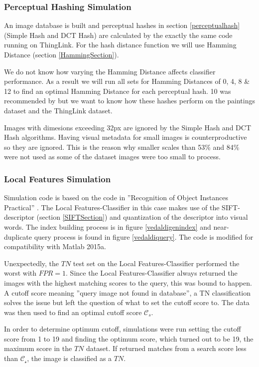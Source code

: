 \documentclass[english,12pt,a4paper,pdftex,elec,utf8, table]{aaltothesis}
\begin{document}
\subsubsection{Perceptual Hashing Simulation}
An image database is built and perceptual hashes in section \ref{perceptualhash} (Simple Hash and DCT Hash) are calculated by the exactly the same code running on ThingLink. For the hash distance function we will use Hamming Distance (section \ref{HammingSection}).

We do not know how varying the Hamming Distance affects classifier performance. As a result we will run all sets for Hamming Distances of 0, 4, 8 \& 12 to find an optimal Hamming Distance for each perceptual hash. 10 was recommended by \cite{Zauner2010} but we want to know how these hashes perform on the paintings dataset and the ThingLink dataset.

Images with dimesions exceeding 32px are ignored by the Simple Hash and DCT Hash algorithms. Having visual metadata for small images is counterproductive so they are ignored. This is the reason why smaller scales than 53\% and 84\% were not used as some of the dataset images were too small to process.

\subsubsection{Local Features Simulation}
Simulation code is based on the code in ''Recognition of Object Instances Practical'' \cite{Vedaldi2012}. The Local Features-Classifier in this case makes use of the SIFT-descriptor (section \ref{SIFTSection}) and quantization of the descriptor into visual words. The index building process is in figure \ref{vedaldigenindex} and near-duplicate query process is found in figure \ref{vedaldiquery}. The code is modified for compatibility with Matlab 2015a.

Unexpectedly, the $TN$ test set on the Local Features-Classifier performed the worst with $FPR = 1$. Since the Local Features-Classifier always returned the images with the highest matching scores to the query, this was bound to happen. A cutoff score meaning ''query image not found in database'', a TN classification solves the issue but left the question of what to set the cutoff score to. The data was then used to find an optimal cutoff score $\mathcal{C}_s$.

In order to determine optimum cutoff, simulations were run setting the cutoff score from 1 to 19 and finding the optimum score, which turned out to be 19, the maximum score in the $TN$ dataset. If returned matches from a search score less than $\mathcal{C_s}$, the image is classified as a $TN$.
\end{document}

